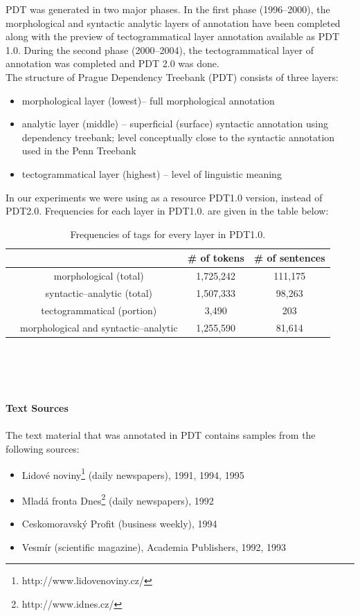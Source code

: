 PDT was generated in two major phases. In the first phase (1996--2000), the morphological and syntactic analytic  layers of annotation have been completed along with the preview of tectogrammatical layer annotation available as  PDT 1.0. During the second phase (2000--2004), the tectogrammatical layer of annotation was completed and PDT 2.0 was done.
\\The structure of Prague Dependency Treebank (PDT) consists of three layers:
\begin{itemize}
\item morphological layer (lowest)-- full morphological annotation
\item analytic  layer (middle) -- superficial (surface) syntactic annotation using dependency treebank; level conceptually close to the syntactic annotation used in the Penn Treebank 
\item tectogrammatical layer (highest) -- level of linguistic meaning
\end{itemize}
In our experiments we were using as a resource PDT1.0 version, instead of PDT2.0. Frequencies for each layer in PDT1.0. are given in the table below:
\begin{table}[h!]
\begin{center}
	\begin{tabular}{ l  c  | c c }
   	&    & \# of tokens & \# of sentences \\
	\hline                       
	& morphological (total) & 1,725,242 & 111,175\\
	& syntactic--analytic (total) & 1,507,333 & 98,263 \\
  	& tectogrammatical (portion) & 3,490 &  203 \\
	& morphological and syntactic--analytic & 1,255,590 & 81,614 \\
	\end{tabular}
\end{center}
\caption{Frequencies of tags for every layer in PDT1.0.}
\end{table}
\\\\\\\\
\textbf{Text Sources}
\\\\The text material that was annotated in PDT contains samples from the following sources:
\begin{itemize}
\item Lidov\'e noviny\footnote{http://www.lidovenoviny.cz/} (daily newspapers), 1991, 1994, 1995
\item Mlad\'a fronta Dnes\footnote{http://www.idnes.cz/} (daily newspapers), 1992
\item Ceskomoravsk\'y Profit (business weekly), 1994
\item Vesm\'ir (scientific magazine), Academia Publishers, 1992, 1993
\end{itemize}

